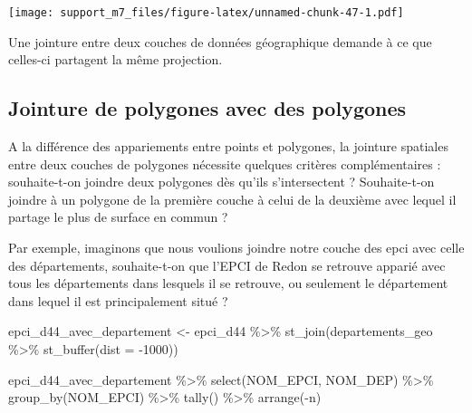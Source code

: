 \documentclass[
]{book}
\newenvironment{Shaded}{\begin{snugshade}}{\end{snugshade}}
\newcommand{\AttributeTok}[1]{\textcolor[rgb]{0.77,0.63,0.00}{#1}}
\newcommand{\DecValTok}[1]{\textcolor[rgb]{0.00,0.00,0.81}{#1}}
\newcommand{\FunctionTok}[1]{\textcolor[rgb]{0.00,0.00,0.00}{#1}}
\newcommand{\NormalTok}[1]{#1}
\newcommand{\OtherTok}[1]{\textcolor[rgb]{0.56,0.35,0.01}{#1}}
\newcommand{\SpecialCharTok}[1]{\textcolor[rgb]{0.00,0.00,0.00}{#1}}
\begin{document}
\texttt{[image: support\_m7\_files/figure-latex/unnamed-chunk-47-1.pdf]}

\begin{rmdnote}
Une jointure entre deux couches de données géographique demande à ce que celles-ci partagent la même projection.
\end{rmdnote}

\hypertarget{jointure-de-polygones-avec-des-polygones}{%
\subsection{Jointure de polygones avec des polygones}\label{jointure-de-polygones-avec-des-polygones}}

A la différence des appariements entre points et polygones, la jointure spatiales entre deux couches de polygones nécessite quelques critères complémentaires : souhaite-t-on joindre deux polygones dès qu'ils s'intersectent ? Souhaite-t-on joindre à un polygone de la première couche à celui de la deuxième avec lequel il partage le plus de surface en commun ?

Par exemple, imaginons que nous voulions joindre notre couche des epci avec celle des départements, souhaite-t-on que l'EPCI de Redon se retrouve apparié avec tous les départements dans lesquels il se retrouve, ou seulement le département dans lequel il est principalement situé ?

\begin{Shaded}
\begin{Highlighting}[]
\NormalTok{epci\_d44\_avec\_departement }\OtherTok{\textless{}{-}}\NormalTok{ epci\_d44 }\SpecialCharTok{\%\textgreater{}\%}
  \FunctionTok{st\_join}\NormalTok{(departements\_geo }\SpecialCharTok{\%\textgreater{}\%} \FunctionTok{st\_buffer}\NormalTok{(}\AttributeTok{dist =} \SpecialCharTok{{-}}\DecValTok{1000}\NormalTok{))}

\NormalTok{epci\_d44\_avec\_departement }\SpecialCharTok{\%\textgreater{}\%}
  \FunctionTok{select}\NormalTok{(NOM\_EPCI, NOM\_DEP) }\SpecialCharTok{\%\textgreater{}\%}
  \FunctionTok{group\_by}\NormalTok{(NOM\_EPCI) }\SpecialCharTok{\%\textgreater{}\%}
  \FunctionTok{tally}\NormalTok{() }\SpecialCharTok{\%\textgreater{}\%}
  \FunctionTok{arrange}\NormalTok{(}\SpecialCharTok{{-}}\NormalTok{n)}
\end{Highlighting}
\end{Shaded}
\end{document}
